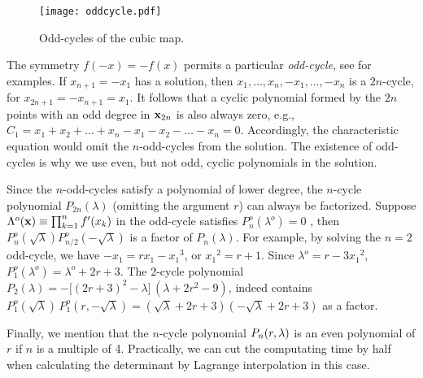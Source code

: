 \documentclass{ws-ijbc}
\begin{document}
%
%
\begin{figure}[h]
  \begin{center}
  \begin{minipage}{\linewidth}
        \texttt{[image: oddcycle.pdf]}
  \end{minipage}%
  \end{center}
  \caption{\label{fig:oddcycle}
  Odd-cycles of the cubic map.}
\end{figure}
%
%

The symmetry $f(-x) = -f(x)$ permits
  a particular \emph{odd-cycle},
  see  for examples.
If $x_{n+1} = -x_1$ has a solution,
  then $x_1, \ldots, x_{n}, -x_1, \ldots, -x_{n}$
  is a $2n$-cycle, for $x_{2n+1} = - x_{n+1} = x_1$.
%
It follows that a cyclic polynomial
  formed by the $2n$ points
  with an odd degree in $\mathbf{x}_{2n}$
  is also always zero,
  e.g., $C_1 = x_1 + x_2 + \dots + x_n - x_1 - x_2 - \dots - x_n = 0$.
Accordingly, the characteristic equation 
  would omit the $n$-odd-cycles from the solution.
The existence of odd-cycles is why we use even, but not odd,
  cyclic polynomials in the solution.


Since the $n$-odd-cycles satisfy a polynomial of lower degree,
  the $n$-cycle polynomial $P_{2n}(\lambda)$
  (omitting the argument $r$)
  can always be factorized.
%
Suppose $\Lambda^o(\mathbf{x}) \equiv \prod_{k = 1}^{n} f'(x_k)$ in the odd-cycle
 satisfies $P_{n}^o(\lambda^o) = 0$
\big[where $\lambda^o$ is the value of $\Lambda^o(\vx)$,
and $\lambda^o = \pm\sqrt \lambda$\,\big],
then $P^o_{n}(\sqrt \lambda) P^o_{n/2}(-\sqrt \lambda)$
is a factor of $P_{n}(\lambda)$.
%
For example, by solving the $n = 2$ odd-cycle,
  we have $- x_1 = r x_1 - {x_1}^3$, or ${x_1}^2 = r + 1$.
Since $\lambda^o = r - 3 {x_1}^2$,
$P^o_1(\lambda^o) = \lambda^o + 2 r + 3$.
%
The 2-cycle polynomial
  $P_2(\lambda) = -\big[(2r+3)^2 - \lambda\big]\,(\lambda + 2r^2-9)$,
  indeed contains
  $P^o_1(\sqrt \lambda) \, P^o_1(r, -\sqrt \lambda)
   = (\sqrt \lambda + 2 r + 3)(-\sqrt \lambda + 2 r + 3)$
  as a factor.


Finally, we mention that the $n$-cycle polynomial $P_n(r, \lambda)$
  is an even polynomial of $r$ if $n$ is a multiple of 4.
Practically, we can cut the computating time by half
  when calculating the determinant by Lagrange interpolation
  in this case.
\end{document}

